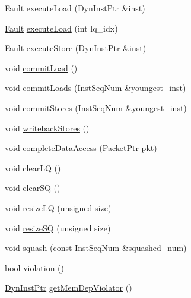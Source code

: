 \begin{DoxyCompactItemize}
\item 
\hyperlink{classRefCountingPtr}{Fault} \hyperlink{classLSQUnit_a30c6332142c2ecca389ed6ee463c692b}{executeLoad} (\hyperlink{classLSQUnit_a028ce10889c5f6450239d9e9a7347976}{DynInstPtr} \&inst)
\item 
\hyperlink{classRefCountingPtr}{Fault} \hyperlink{classLSQUnit_a091a4d1788ce66e51ceb888bbd85ac08}{executeLoad} (int lq\_\-idx)
\item 
\hyperlink{classRefCountingPtr}{Fault} \hyperlink{classLSQUnit_aad78b8a37ee5c61e47df58dd39980340}{executeStore} (\hyperlink{classLSQUnit_a028ce10889c5f6450239d9e9a7347976}{DynInstPtr} \&inst)
\item 
void \hyperlink{classLSQUnit_a8ddd26e169a62ec5ae591a9f95934839}{commitLoad} ()
\item 
void \hyperlink{classLSQUnit_a1ae517a923a864a4e3a5aa1eeb2dd2d6}{commitLoads} (\hyperlink{inst__seq_8hh_a258d93d98edaedee089435c19ea2ea2e}{InstSeqNum} \&youngest\_\-inst)
\item 
void \hyperlink{classLSQUnit_a954ce1ce58b67cae49ba127d5ea40701}{commitStores} (\hyperlink{inst__seq_8hh_a258d93d98edaedee089435c19ea2ea2e}{InstSeqNum} \&youngest\_\-inst)
\item 
void \hyperlink{classLSQUnit_a5f04e29d6f6feb8b86460491f2ba7547}{writebackStores} ()
\item 
void \hyperlink{classLSQUnit_a0f7f0d3412bbf494cd3d0c0f48e5fcf2}{completeDataAccess} (\hyperlink{classPacket}{PacketPtr} pkt)
\item 
void \hyperlink{classLSQUnit_ae3af532345dbe6519e8272d9cd677230}{clearLQ} ()
\item 
void \hyperlink{classLSQUnit_a171cd7891063f418b1ee217f5c03537b}{clearSQ} ()
\item 
void \hyperlink{classLSQUnit_a3bc9500810cb2d5615e29206e2d6499f}{resizeLQ} (unsigned size)
\item 
void \hyperlink{classLSQUnit_a341dd6a3bd8d240659fd9d698c3b5c65}{resizeSQ} (unsigned size)
\item 
void \hyperlink{classLSQUnit_a51dd7e304d5413447717826fac6f4921}{squash} (const \hyperlink{inst__seq_8hh_a258d93d98edaedee089435c19ea2ea2e}{InstSeqNum} \&squashed\_\-num)
\item 
bool \hyperlink{classLSQUnit_a4f720bbfb5fdefdb23516500eeb0b4de}{violation} ()
\item 
\hyperlink{classLSQUnit_a028ce10889c5f6450239d9e9a7347976}{DynInstPtr} \hyperlink{classLSQUnit_a30adaf6f5fb6b38b5747f35c419e3f31}{getMemDepViolator} ()
\item 

\end{DoxyCompactItemize}
